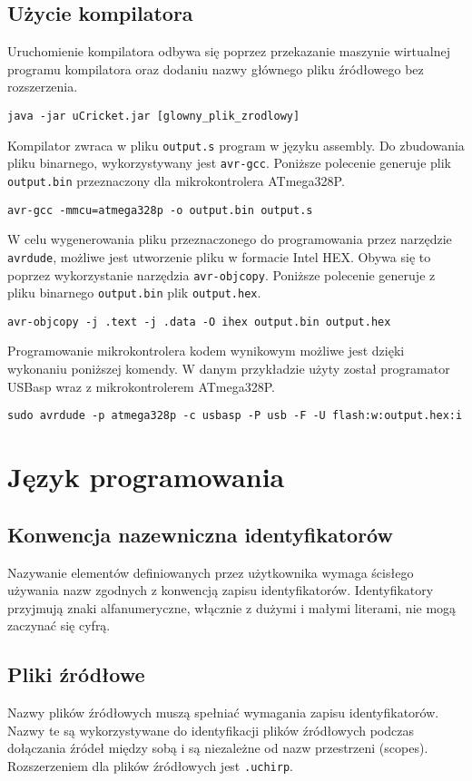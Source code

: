 \subsection{Użycie kompilatora}
Uruchomienie kompilatora odbywa się poprzez przekazanie maszynie wirtualnej programu kompilatora oraz dodaniu nazwy głównego pliku źródłowego bez rozszerzenia.
\begin{lstlisting}
java -jar uCricket.jar [glowny_plik_zrodlowy]
\end{lstlisting}
Kompilator zwraca w pliku \lstinline|output.s| program w języku assembly. Do zbudowania pliku binarnego, wykorzystywany jest \lstinline|avr-gcc|. Poniższe polecenie generuje plik \lstinline|output.bin| przeznaczony dla mikrokontrolera ATmega328P.
\begin{lstlisting}
avr-gcc -mmcu=atmega328p -o output.bin output.s
\end{lstlisting}
W celu wygenerowania pliku przeznaczonego do programowania przez narzędzie \lstinline|avrdude|, możliwe jest utworzenie pliku w formacie Intel HEX. Obywa się to poprzez wykorzystanie narzędzia \lstinline|avr-objcopy|. Poniższe polecenie generuje z pliku binarnego \lstinline|output.bin| plik \lstinline|output.hex|.
\begin{lstlisting}
avr-objcopy -j .text -j .data -O ihex output.bin output.hex
\end{lstlisting}
Programowanie mikrokontrolera kodem wynikowym możliwe jest dzięki wykonaniu poniższej komendy. W danym przykładzie użyty został programator USBasp wraz z mikrokontrolerem ATmega328P.
\begin{lstlisting}
sudo avrdude -p atmega328p -c usbasp -P usb -F -U flash:w:output.hex:i
\end{lstlisting}

\section{Język programowania}
\subsection{Konwencja nazewniczna identyfikatorów}
Nazywanie elementów definiowanych przez użytkownika wymaga ścisłego używania nazw zgodnych z konwencją zapisu identyfikatorów. Identyfikatory przyjmują znaki alfanumeryczne, włącznie z dużymi i małymi literami, nie mogą zaczynać się cyfrą.

\subsection{Pliki źródłowe}
Nazwy plików źródłowych muszą spełniać wymagania zapisu identyfikatorów. Nazwy te są wykorzystywane do identyfikacji plików źródłowych podczas dołączania źródeł między sobą i są niezależne od nazw przestrzeni (scopes). Rozszerzeniem dla plików źródłowych jest \lstinline|.uchirp|.

